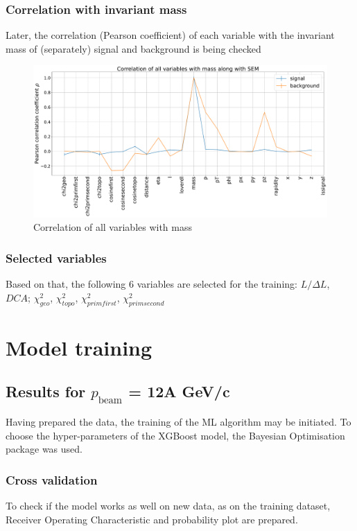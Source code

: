 \subsubsection{Correlation with invariant mass}
Later, the correlation (Pearson coefficient) of each variable with the invariant mass of (separately) signal and background is being checked 
\begin{figure}[H]
    \centering
    \includegraphics[width=1\textwidth]{img/Correlation_of_all_variables_with_mass_along_with_SEM.pdf}
    \caption{Correlation of all variables with mass}
\end{figure}

\subsubsection{Selected variables}
Based on that, the following 6 variables are selected for the training: $L/\Delta L$, $DCA$;  $\chi^2_{geo}$, $\chi^2_{topo}$, $\chi^2_{prim first}$, $\chi^2_{prim second}$

\section{Model training}
\subsection{Results for $p_{\text{beam}}$ = 12A GeV/c}
Having prepared the data, the training of the ML algorithm may be initiated. To choose the hyper-parameters of the XGBoost model, the Bayesian Optimisation package was used.\\
\subsubsection{Cross validation}
To check if the model works as well on new data, as on the training dataset,  Receiver Operating Characteristic and probability plot are prepared.

